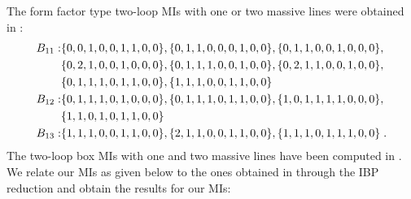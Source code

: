 \documentclass[11pt,a4paper]{article}
\begin{document}
%
The form factor type two-loop MIs with one or two massive lines were obtained in \cite{Aglietti:2003yc,Aglietti:2004tq}:
\begin{align}
%
B_{11} :&
\{0, 0, 1, 0, 0, 1, 1, 0, 0\}, \{0, 1, 1, 0, 0, 0, 1, 0, 0\}, \{0, 1, 1, 0, 0, 1, 0, 0, 0\},  \nn
\{0, 2, 1, 0, 0, 1, 0, 0, 0\}, \{0, 1, 1, 1, 0, 0, 1, 0, 0\}, \{0, 2, 1, 1, 0, 0, 1, 0, 0\},  \nn
\{0, 1, 1, 1, 0, 1, 1, 0, 0\}, \{1, 1, 1, 0, 0, 1, 1, 0, 0\}
\nonumber\\
%
B_{12} :&
\{0, 1, 1, 1, 0, 1, 0, 0, 0\}, \{0, 1, 1, 1, 0, 1, 1, 0, 0\}, \{1, 0, 1, 1, 1, 1, 0, 0, 0\},  \nn
\{1, 1, 0, 1, 0, 1, 1, 0, 0\}
\nonumber\\
%
B_{13} :&
\{1, 1, 1, 0, 0, 1, 1, 0, 0\}, \{2, 1, 1, 0, 0, 1, 1, 0, 0\}, \{1, 1, 1, 0, 1, 1, 1, 0, 0\}\;.
% 
\label{eq:miB11}
\end{align}
%
The two-loop box MIs with one and two massive lines have been computed in \cite{Bonciani:2016ypc,Heller:2019gkq,Hasan:2020vwn}.
We relate our MIs as given below to the ones obtained in \cite{Bonciani:2016ypc} through the IBP reduction
and obtain the results for our MIs:
\end{document}
